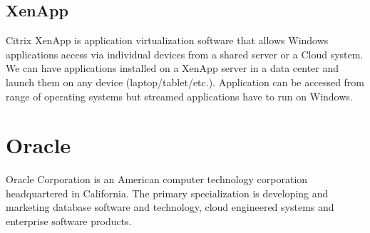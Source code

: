 \subsection{XenApp}
Citrix XenApp is application virtualization software that allows Windows applications access via individual devices from a shared server or a Cloud system. We can have applications installed on a XenApp server in a data center and launch them on any device (laptop/tablet/etc.). Application can be accessed from range of operating systems but streamed applications have to run on Windows.


\section{Oracle}
Oracle Corporation is an American computer technology corporation headquartered in California. The primary specialization is developing and marketing database software and technology, cloud engineered systems and enterprise software products.

